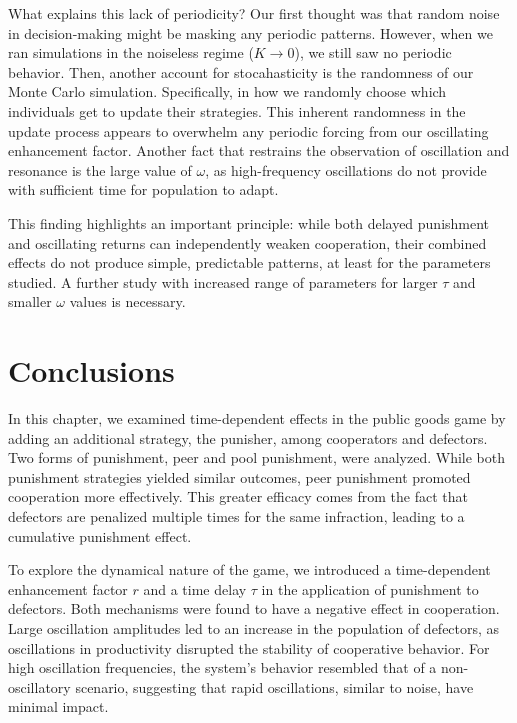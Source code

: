 What explains this lack of periodicity? Our first thought was that random noise in decision-making might be masking any periodic patterns. However, when we ran simulations in the noiseless regime ($K \to 0$), we still saw no periodic behavior. Then, another account for stocahasticity is the randomness of our Monte Carlo simulation. Specifically, in how we randomly choose which individuals get to update their strategies. This inherent randomness in the update process appears to overwhelm any periodic forcing from our oscillating enhancement factor. Another fact that restrains the observation of oscillation and resonance is the large value of $\omega$, as high-frequency oscillations do not provide with sufficient time for population to adapt. 

This finding highlights an important principle: while both delayed punishment and oscillating returns can independently weaken cooperation, their combined effects do not produce simple, predictable patterns, at least for the parameters studied. A further study with increased range of parameters for larger $\tau$ and smaller $\omega$ values is necessary.




\section{Conclusions }
\label{3Conclusions}


In this chapter, we examined time-dependent effects in the public goods game by adding an additional strategy, the punisher, among cooperators and defectors. Two forms of punishment, peer and pool punishment, were analyzed. While both punishment strategies yielded similar outcomes, peer punishment promoted cooperation more effectively. This greater efficacy comes from the fact that defectors are penalized multiple times for the same infraction, leading to a cumulative punishment effect.

To explore the dynamical nature of the game, we introduced a time-dependent enhancement factor $r$ and a time delay $\tau$ in the application of punishment to defectors. Both mechanisms were found to have a negative effect in cooperation. Large oscillation amplitudes led to an increase in the population of defectors, as oscillations in productivity disrupted the stability of cooperative behavior. For high oscillation frequencies, the system's behavior resembled that of a non-oscillatory scenario, suggesting that rapid oscillations, similar to noise, have minimal impact.

